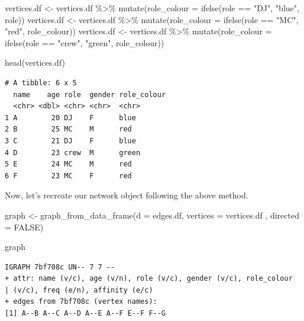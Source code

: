 \documentclass[
  letterpaper,
  DIV=11,
  numbers=noendperiod]{scrreprt}
\newenvironment{Shaded}{\begin{snugshade}}{\end{snugshade}}
\newcommand{\AttributeTok}[1]{\textcolor[rgb]{0.40,0.45,0.13}{#1}}
\newcommand{\ConstantTok}[1]{\textcolor[rgb]{0.56,0.35,0.01}{#1}}
\newcommand{\FunctionTok}[1]{\textcolor[rgb]{0.28,0.35,0.67}{#1}}
\newcommand{\NormalTok}[1]{\textcolor[rgb]{0.00,0.23,0.31}{#1}}
\newcommand{\OtherTok}[1]{\textcolor[rgb]{0.00,0.23,0.31}{#1}}
\newcommand{\SpecialCharTok}[1]{\textcolor[rgb]{0.37,0.37,0.37}{#1}}
\newcommand{\StringTok}[1]{\textcolor[rgb]{0.13,0.47,0.30}{#1}}
\begin{document}
\begin{Shaded}
\begin{Highlighting}[]
\NormalTok{vertices.df }\OtherTok{\textless{}{-}}\NormalTok{ vertices.df }\SpecialCharTok{\%\textgreater{}\%}
  \FunctionTok{mutate}\NormalTok{(}\AttributeTok{role\_colour =} \FunctionTok{ifelse}\NormalTok{(role }\SpecialCharTok{==} \StringTok{"DJ"}\NormalTok{, }\StringTok{"blue"}\NormalTok{, role)) }
\NormalTok{vertices.df }\OtherTok{\textless{}{-}}\NormalTok{ vertices.df }\SpecialCharTok{\%\textgreater{}\%}
  \FunctionTok{mutate}\NormalTok{(}\AttributeTok{role\_colour =} \FunctionTok{ifelse}\NormalTok{(role }\SpecialCharTok{==} \StringTok{"MC"}\NormalTok{, }\StringTok{"red"}\NormalTok{, role\_colour))}
\NormalTok{vertices.df }\OtherTok{\textless{}{-}}\NormalTok{ vertices.df }\SpecialCharTok{\%\textgreater{}\%}
  \FunctionTok{mutate}\NormalTok{(}\AttributeTok{role\_colour =} \FunctionTok{ifelse}\NormalTok{(role }\SpecialCharTok{==} \StringTok{"crew"}\NormalTok{, }\StringTok{"green"}\NormalTok{, role\_colour))}

\FunctionTok{head}\NormalTok{(vertices.df)}
\end{Highlighting}
\end{Shaded}

\begin{verbatim}
# A tibble: 6 x 5
  name    age role  gender role_colour
  <chr> <dbl> <chr> <chr>  <chr>      
1 A        20 DJ    F      blue       
2 B        25 MC    M      red        
3 C        21 DJ    F      blue       
4 D        23 crew  M      green      
5 E        24 MC    M      red        
6 F        23 MC    F      red        
\end{verbatim}

Now, let's recreate our network object following the above method.

\begin{Shaded}
\begin{Highlighting}[]
\NormalTok{graph }\OtherTok{\textless{}{-}} \FunctionTok{graph\_from\_data\_frame}\NormalTok{(}\AttributeTok{d =}\NormalTok{ edges.df, }\AttributeTok{vertices =}\NormalTok{ vertices.df , }\AttributeTok{directed =} \ConstantTok{FALSE}\NormalTok{)}

\NormalTok{graph}
\end{Highlighting}
\end{Shaded}

\begin{verbatim}
IGRAPH 7bf708c UN-- 7 7 -- 
+ attr: name (v/c), age (v/n), role (v/c), gender (v/c), role_colour
| (v/c), freq (e/n), affinity (e/c)
+ edges from 7bf708c (vertex names):
[1] A--B A--C A--D A--E A--F E--F F--G
\end{verbatim}
\end{document}
